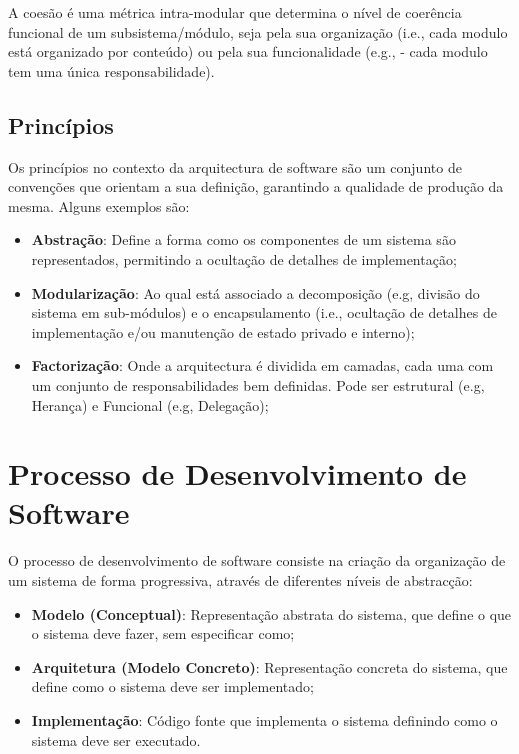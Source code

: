 A coesão é uma métrica intra-modular que determina o nível de coerência funcional de um subsistema/módulo, seja pela sua organização (i.e., cada modulo está organizado por conteúdo) ou pela sua funcionalidade (e.g.,  - cada modulo tem uma única responsabilidade).

\subsection{Princípios}\label{subsec:principios}

Os princípios no contexto da arquitectura de software são um conjunto de convenções que orientam a sua definição, garantindo a qualidade de produção da mesma. Alguns exemplos são:
\begin{itemize}
    \item \textbf{Abstração}: Define a forma como os componentes de um sistema são representados, permitindo a ocultação de detalhes de implementação;
    \item \textbf{Modularização}: Ao qual está associado a decomposição (e.g, divisão do sistema em sub-módulos) e o encapsulamento (i.e., ocultação de detalhes de implementação e/ou manutenção de estado privado e interno);
    \item \textbf{Factorização}: Onde a arquitectura é dividida em camadas, cada uma com um conjunto de responsabilidades bem definidas. Pode ser estrutural (e.g, Herança) e Funcional (e.g, Delegação);
\end{itemize}


\section{Processo de Desenvolvimento de Software}\label{sec:processo-de-desenvolvimento-de-software}

O processo de desenvolvimento de software consiste na
criação da organização de um sistema de forma
progressiva, através de diferentes níveis de abstracção:

\begin{itemize}
    \item \textbf{Modelo (Conceptual)}: Representação abstrata do sistema, que define o que o sistema deve fazer, sem especificar como;
    \item \textbf{Arquitetura (Modelo Concreto)}: Representação concreta do sistema, que define como o sistema deve ser implementado;
    \item \textbf{Implementação}: Código fonte que implementa o sistema definindo como o sistema deve ser executado.
\end{itemize}

